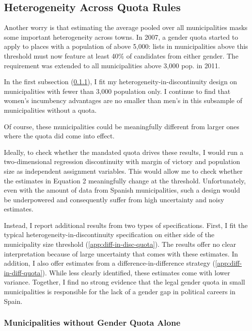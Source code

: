 \documentclass[12pt]{article}
\begin{document}



\clearpage
\subsection{Heterogeneity Across Quota Rules}
\label{app:spain_by_quota}

Another worry is that estimating the average pooled over all municipalities masks some important heterogeneity across towns. In 2007, a gender quota started to apply to places with a population of above 5,000: lists in municipalities above this threshold must now feature at least 40\% of candidates from either gender. The requirement was extended to all municipalities above 3,000 pop. in 2011.

In the first subsection (\ref{app:below_quota}), I fit my heterogeneity-in-discontinuity design on municipalities with fewer than 3,000 population only. I continue to find that women's incumbency advantages are no smaller than men's in this subsample of municipalities without a quota.

Of course, these municipalities could be meaningfully different from larger ones where the quota did come into effect.

Ideally, to check whether the mandated quota drives these results, I would run a two-dimensional regression discontinuity with margin of victory and population size as independent assignment variables. This would allow me to check whether the estimates in Equation 2 meaningfully change at the threshold. Unfortunately, even with the amount of data from Spanish municipalities, such a design would be underpowered and consequently suffer from high uncertainty and noisy estimates.

Instead, I report additional results from two types of specifications. First, I fit the typical heterogeneity-in-discontinuity specification on either side of the municipality size threshold (\ref{app:diff-in-disc-quota}). The results offer no clear interpretation because of large uncertainty that comes with these estimates. In addition, I also offer estimates from a difference-in-difference strategy (\ref{app:diff-in-diff-quota}). While less clearly identified, these estimates come with lower variance. Together, I find no strong evidence that the legal gender quota in small municipalities is responsible for the lack of a gender gap in political careers in Spain.

\clearpage
\subsubsection{Municipalities without Gender Quota Alone}
\label{app:below_quota}
\end{document}
